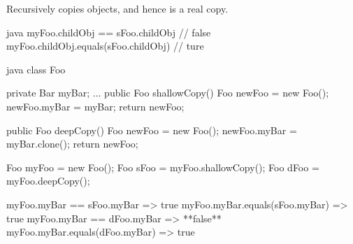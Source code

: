 \begin{defnbox}\nospacing
  \begin{defn}\label{defn:deepcopy}
    Recursively copies objects, and hence is a real copy.
    \begin{mintlinebox}{java}
      myFoo.childObj == sFoo.childObj // false
      myFoo.childObj.equals(sFoo.childObj) // ture
    \end{mintlinebox}
  \end{defn}
\end{defnbox}
\begin{codeboxNl}{java}
class Foo {
  private Bar myBar;
  ...
  public Foo shallowCopy() {
    Foo newFoo = new Foo();
    newFoo.myBar = myBar;
    return newFoo;
  }

  public Foo deepCopy() {
    Foo newFoo = new Foo();
    newFoo.myBar = myBar.clone();
    return newFoo;
  }
}

Foo myFoo = new Foo();  
Foo sFoo = myFoo.shallowCopy();  
Foo dFoo = myFoo.deepCopy();  

myFoo.myBar == sFoo.myBar => true  
myFoo.myBar.equals(sFoo.myBar) => true  
myFoo.myBar == dFoo.myBar => **false**  
myFoo.myBar.equals(dFoo.myBar) => true  
\end{codeboxNl}
